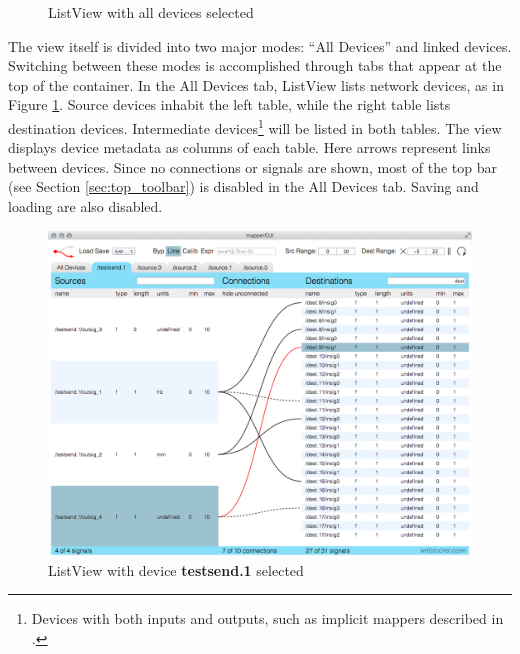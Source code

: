 \begin{figure}[ht]
\centering
\caption{ListView with all devices selected}
\label{fig:list_view_all_devices}
\end{figure}

The view itself is divided into two major modes: ``All Devices'' and linked devices. Switching between these modes is accomplished through tabs that appear at the top of the container. In the All Devices tab, ListView lists network devices, as in Figure \ref{fig:list_view_all_devices}. Source devices inhabit the left table, while the right table lists destination devices. Intermediate devices\footnote{Devices with both inputs and outputs, such as implicit mappers described in .} will be listed in both tables. The view displays device metadata as columns of each table. Here arrows represent links between devices. Since no connections or signals are shown, most of the top bar (see Section \ref{sec:top_toolbar}) is disabled in the All Devices tab. Saving and loading are also disabled.

\begin{figure}[ht]
\centering
	\includegraphics[width=1\textwidth]{figures/list_view_single_link}
\caption{ListView with device \textbf{testsend.1} selected}
\label{fig:list_view_single_link}
\end{figure}

